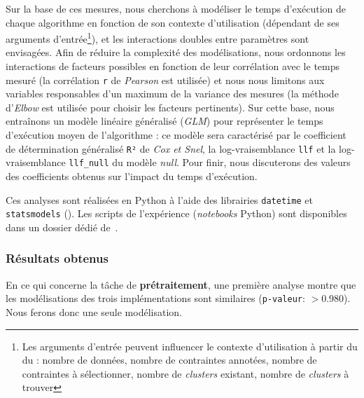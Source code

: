 			Sur la base de ces mesures, nous cherchons à modéliser le temps d'exécution de chaque algorithme en fonction de son contexte d'utilisation (dépendant de ses arguments d'entrée\footnote{Les arguments d'entrée peuvent influencer le contexte d'utilisation à partir du du : nombre de données, nombre de contraintes annotées, nombre de contraintes à sélectionner, nombre de \textit{clusters} existant, nombre de \textit{clusters} à trouver}), et les interactions doubles entre paramètres sont envisagées.
			Afin de réduire la complexité des modélisations, nous ordonnons les interactions de facteurs possibles en fonction de leur corrélation avec le temps mesuré (la corrélation \texttt{r} de \textit{Pearson} est utilisée) et nous nous limitons aux variables responsables d'un maximum de la variance des mesures (la méthode d'\textit{Elbow} est utilisée pour choisir les facteurs pertinents).
			Sur cette base, nous entraînons un modèle linéaire généralisé (\textit{GLM}) pour représenter le temps d'exécution moyen de l'algorithme : ce modèle sera caractérisé par le coefficient de détermination généralisé \texttt{R²} de \textit{Cox et Snel}, la log-vraisemblance \texttt{llf} et la log-vraisemblance \texttt{llf\_null} du modèle \textit{null}.
			Pour finir, nous discuterons des valeurs des coefficients obtenus sur l'impact du temps d'exécution.
			
			\begin{leftBarInformation}
				Ces analyses sont réalisées en Python à l'aide des librairies \texttt{datetime} et \texttt{statsmodels} (\cite{seabold:2010}).
				Les scripts de l'expérience (\textit{notebooks} Python) sont disponibles dans un dossier dédié de~\cite{schild:cognitivefactory-interactive-clustering-comparative-study:2021}.
			\end{leftBarInformation}

		\subsubsection{Résultats obtenus}
				
			
			En ce qui concerne la tâche de \textbf{prétraitement}, une première analyse montre que les modélisations des trois implémentations sont similaires (\texttt{p-valeur}: $> 0.980$). Nous ferons donc une seule modélisation.
			
